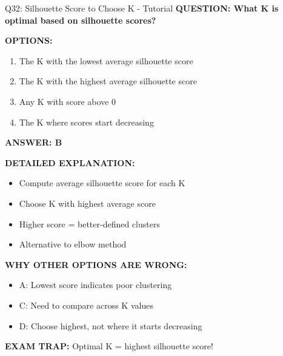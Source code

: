 \documentclass[8pt]{beamer}
\begin{document}
	\begin{frame}{Q32: Silhouette Score to Choose K - Tutorial}
		\fontsize{6.5}{7.5}\selectfont
		\textbf{QUESTION: What K is optimal based on silhouette scores?}
		
		\vspace{0.1cm}
		\textbf{OPTIONS:}
		\begin{enumerate}
			\item The K with the lowest average silhouette score
			\item The K with the highest average silhouette score
			\item Any K with score above 0
			\item The K where scores start decreasing
		\end{enumerate}
		
		\vspace{0.1cm}
		\textcolor{myblue}{\textbf{ANSWER: B}}
		
		\vspace{0.1cm}
		\textbf{DETAILED EXPLANATION:}
		\begin{itemize}
			\item Compute average silhouette score for each K
			\item Choose K with highest average score
			\item Higher score = better-defined clusters
			\item Alternative to elbow method
		\end{itemize}
		
		\vspace{0.1cm}
		\textcolor{myred}{\textbf{WHY OTHER OPTIONS ARE WRONG:}}
		\begin{itemize}
			\item \textcolor{myred}{A:} Lowest score indicates poor clustering
			\item \textcolor{myred}{C:} Need to compare across K values
			\item \textcolor{myred}{D:} Choose highest, not where it starts decreasing
		\end{itemize}
		
		\textcolor{myred}{\textbf{EXAM TRAP:}} Optimal K = \textcolor{myblue}{highest silhouette score}!
	\end{frame}
	
\end{document}
